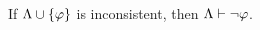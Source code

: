%
%
%
%
%
%
%
%
%
%   

\begin{Lthm} \label{lemma:PL-incon}
  If $\Lambda\cup\lbrace\varphi\rbrace$ is inconsistent, then $\Lambda\vdash\neg\varphi$. 
\end{Lthm} \vspace{-.2in}

